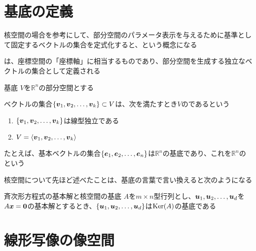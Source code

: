 \documentclass[../../../topic_linear-algebra]{subfiles}
\begin{document}
\sectionline
\section{基底の定義}

核空間の場合を参考にして、部分空間のパラメータ表示を与えるために基準として固定するベクトルの集合を定式化すると、という概念になる

\br

は、座標空間の「座標軸」に相当するものであり、部分空間を生成する独立なベクトルの集合として定義される

\begin{definition}{基底}
  $V$を$\mathbb{R}^n$の部分空間とする

  ベクトルの集合$\{ \vb*{v}_1, \vb*{v}_2, \dots, \vb*{v}_k \} \subset V$は、次を満たすとき$V$のであるという
  \begin{enumerate}[label=\romanlabel]
    \item $\{ \vb*{v}_1, \vb*{v}_2, \dots, \vb*{v}_k \}$は線型独立である
    \item $V = \langle \vb*{v}_1, \vb*{v}_2, \dots, \vb*{v}_k \rangle$
  \end{enumerate}
\end{definition}

たとえば、基本ベクトルの集合$\{ \vb*{e}_1, \vb*{e}_2, \dots, \vb*{e}_n \}$は$\mathbb{R}^n$の基底であり、これを$\mathbb{R}^n$のという

\sectionline

核空間について先ほど述べたことは、基底の言葉で言い換えると次のようになる

\begin{theorem}{斉次形方程式の基本解と核空間の基底}
  $A$を$m \times n$型行列とし、$\vb*{u}_1, \vb*{u}_2, \dots, \vb*{u}_d$を$A\vb*{x} = \vb*{0}$の基本解とするとき、$\{ \vb*{u}_1, \vb*{u}_2, \dots, \vb*{u}_d \}$は$\operatorname{Ker}(A)$の基底である
\end{theorem}

\sectionline
\section{線形写像の像空間}

\end{document}
